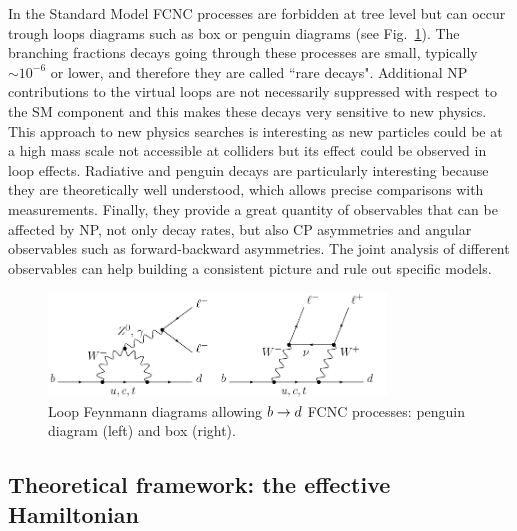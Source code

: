 In the Standard Model FCNC processes are forbidden at tree level but
can occur trough loops diagrams such as \W box or penguin diagrams (see Fig.~\ref{fig:penguins}).
The branching fractions decays going through these processes are small, typically $\sim10^{-6}$ 
or lower, and therefore they are called ``rare decays". Additional NP contributions to the virtual loops
are not necessarily suppressed with respect to the SM component and this makes these decays
very sensitive to new physics. This approach to new physics searches is interesting as
new particles could be at a high mass scale not accessible at colliders but its effect
could be observed in loop effects.
Radiative and penguin decays are particularly interesting because they are theoretically
well understood, which allows precise comparisons with measurements. Finally, they provide
a great quantity of observables that can be affected by NP, not only decay rates, but also CP asymmetries and angular observables such as forward-backward asymmetries. The joint
analysis of different observables can help building a consistent picture and rule out specific models.
%
\begin{figure}[h!]
\centering
\includegraphics[width=0.8\textwidth]{Introduction/figs/penguin_general.png}
\caption{Loop Feynmann diagrams allowing $b \rightarrow d$ FCNC 
processes: penguin diagram (left) and \W box (right).}
\label{fig:penguins}
\end{figure}

\subsection{Theoretical framework: the effective Hamiltonian}
\label{sec:Effective_Hamiltonian}

